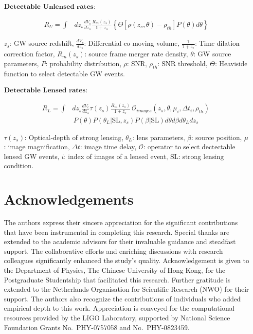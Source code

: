 \documentclass[10pt,a4paper,onecolumn]{article}
\begin{document}
\(\textbf{Detectable Unlensed rates:}\)

\[
\begin{equation*}
\begin{split}
R_U = \int & dz_s \frac{dV_c}{dz_s}\frac{R_m(z_s)}{1+z_s}\left\{\Theta[\rho(z_s,\theta)-\rho_{th}] P(\theta) d\theta \right\}
\end{split}
\end{equation*}
\]

\(z_s\): GW source redshift, \(\frac{dV_c}{dz_s}\): Differential
co-moving volume, \(\frac{1}{1+z_s}\): Time dilation correction factor,
\(R_m(z_s)\): source frame merger rate density, \(\theta\): GW source
parameters, \(P\): probability distribution, \(\rho\): SNR,
\(\rho_{th}\): SNR threshold, \(\Theta\): Heaviside function to select
detectable GW events.

\(\textbf{Detectable Lensed rates:}\)

\[
\begin{equation*}
\begin{split}
R_L = \int & dz_s \frac{dV_c}{dz_s}\tau(z_s)\frac{R_m(z_s)}{1+z_s} \,\mathcal{O}_{images}(z_s,\theta,\mu_i,\Delta t_i, \rho_{th}) \, \\ 
& \, P(\theta) P(\theta_L|\text{SL},z_s) P(\beta|\text{SL}) d\theta d\beta d\theta_L dz_s 
\end{split}
\end{equation*}
\]

\(\tau(z_s)\): Optical-depth of strong lensing, \(\theta_L\): lens
parameters, \(\beta\): source position, \(\mu\): image magnification,
\(\Delta t\): image time delay, \(\mathcal{O}\): operator to select
dectectable lensed GW events, \(i\): index of images of a lensed event,
\(\text{SL}\): strong lensing condition.

\section{Acknowledgements}\label{acknowledgements}

The authors express their sincere appreciation for the significant
contributions that have been instrumental in completing this research.
Special thanks are extended to the academic advisors for their
invaluable guidance and steadfast support. The collaborative efforts and
enriching discussions with research colleagues significantly enhanced
the study's quality. Acknowledgement is given to the Department of
Physics, The Chinese University of Hong Kong, for the Postgraduate
Studentship that facilitated this research. Further gratitude is
extended to the Netherlands Organisation for Scientific Research (NWO)
for their support. The authors also recognize the contributions of
individuals who added empirical depth to this work. Appreciation is
conveyed for the computational resources provided by the LIGO
Laboratory, supported by National Science Foundation Grants
No.~PHY-0757058 and No.~PHY-0823459.
\end{document}
